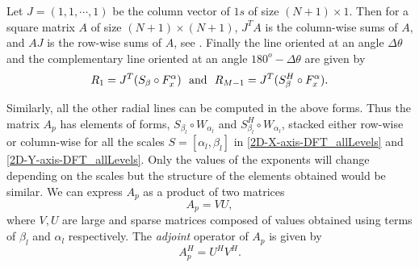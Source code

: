 \documentclass{UCF_ETD}
\begin{document}
 Let $J = (1,1,\cdots,1)$ be the column vector of $1s$ of size $(N+1)\times 1$. Then for a square matrix $A$ of size $(N+1)\times (N+1)$, $J^TA$ is the column-wise sums of $A$, and $AJ$ is the row-wise sums of $A$, see \cite{Rencher2008}. Finally the line oriented at an angle $\Delta \theta$ and the complementary line oriented at an angle $180^o - \Delta \theta$ are given by
 \begin{eqnarray*}
 R_1  = J^T (S_{\beta} \circ F^{\alpha}_x)\ \ {\rm  and}\ \  R_{M-1}  = J^T  (S^H_{\beta} \circ F^{\alpha}_x).
 \end{eqnarray*}
 
 Similarly, all the other radial lines can be computed in the above forms. Thus the matrix $A_p$ has elements of forms, $S_{\beta_l} \circ W_{\alpha_l} $ and $S^H_{\beta_l} \circ W_{\alpha_l} $, stacked either row-wise or column-wise for all the scales $S=[\alpha_l,\beta_l]$ in \eqref{2D-X-axis-DFT_allLevels} and \eqref{2D-Y-axis-DFT_allLevels}. Only the values of the exponents will change depending on the scales but the structure of the elements obtained would be similar. We can express $A_p$ as a product of two matrices
 \begin{equation} \label{LinearSplitForward}
 A_p = V U,
 \end{equation}
 where $V, U$ are large and sparse matrices composed of values obtained using terms of $\beta_l$ and $\alpha_l$ respectively. The \emph{adjoint} operator of $A_p$ is given by
 \begin{equation} \label{LinearSplitAdjoint}
 A^H_p= U^H V^H.
 \end{equation}
 
 
\end{document}
